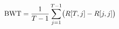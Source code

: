 \documentclass[preview]{standalone}
\begin{document}
\begin{align*}
\special{dvisvgm:raw <g id='unique000'>}\text{BWT} = \frac{1}{T-1}\sum_{j=1}^{T-1}\bigl(R[T,j]-R[j,j]\bigr)\special{dvisvgm:raw </g>}
\end{align*}
\end{document}
